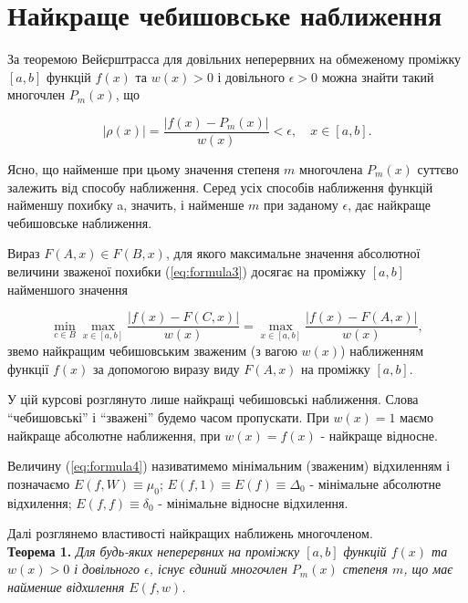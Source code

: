 \documentclass[ukrainian,14pt]{extarticle}
\begin{document}
\section{Найкраще чебишовське наближення}

За теоремою Вейєрштрасса для довільних неперервних на обмеженому проміжку $[a,b]$   
функцій $f(x)$ та $w(x) > 0$ і довільного $\epsilon > 0$ можна знайти такий многочлен $P_m(x)$, що

$$|\rho(x)| = \frac{|f(x) - P_m(x)|}{w(x)} < \epsilon, \quad x \in [a,b].$$

Ясно, що найменше при цьому значення степеня $m$ многочлена $P_m(x)$ суттєво залежить від способу наближення. Серед усіх способів наближення функцій найменшу похибку a, значить, і найменше $m$ при заданому $\epsilon$, дає найкраще чебишовське наближення.

Вираз $F(A,x) \in F(B,x)$, для якого максимальне значення абсолютної величини зваженої похибки (\ref{eq:formula3}) досягає на проміжку $[a,b]$ найменшого значення

\begin{equation}\label{eq:formula4}
\min_{c \in B} \max_{x \in [a,b]} \frac{|f(x) - F(C,x)|}{w(x)} = \max_{x \in [a,b]} \frac{|f(x) - F(A,x)|}{w(x)},
\end{equation}
звемо найкращим чебишовським зваженим (з вагою $w(x)$) наближенням функції $f(x)$ за допомогою виразу виду $F(A,x)$ на проміжку $[a,b]$.

У цій курсові розглянуто лише найкращі чебишовські наближення. Слова ``чебишовські'' і ``зважені'' будемо часом пропускати. При $w(x) = 1$ маємо найкраще абсолютне наближення, при $w(x) = f(x)$ - найкраще відносне.

Величину (\ref{eq:formula4}) називатимемо мінімальним (зваженим) відхиленням і позначаємо $E(f,W)\equiv\mu_0$; $E(f,1) \equiv E(f) \equiv \Delta_0$ - мінімальне абсолютне відхилення; $E(f,f) \equiv \delta_0$ - мінімальне відносне відхилення.

Далі розглянемо властивості найкращих наближень многочленом.\\

\noindent
\textbf{Теорема 1.}\textit{
Для будь-яких неперервних на проміжку $[a,b]$ функцій $f(x)$ та $w(x) > 0$ і довільного $\epsilon$, існує єдиний многочлен $P_m(x)$ степеня $m$, що має найменше відхилення $E(f,w)$.}\\
\end{document}
